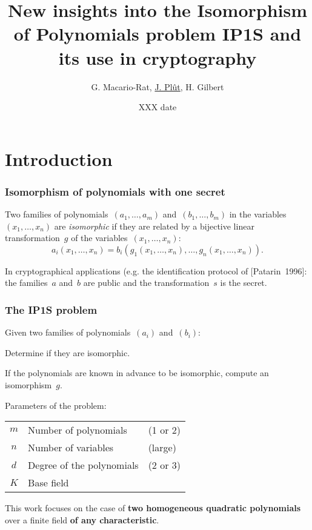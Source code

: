 \documentclass{beamer}%
\def\strong#1{{\bf\color{rouge}#1}}
\begin{document}
\title[New insights into IP1S]%
  {New insights into the Isomorphism of Polynomials problem IP1S and
  its use in cryptography}
\author{G. Macario-Rat, \underline{J. Plût}, H. Gilbert}
\date{XXX date}
%

\begin{frame}
\titlepage
\end{frame}%
\section{Introduction}
\begin{frame}\frametitle{Isomorphism of polynomials with one secret} %

\begin{definition}
Two families of polynomials~$(a_1, …, a_m)$ and~$(b_1, …, b_m)$ in the
variables~$(x_1, …, x_n)$ are \emph{isomorphic} if they are related by a
bijective linear transformation~$g$ of the variables~$(x_1, …, x_n)$:
\[ a_i (x_1, …, x_n) = b_i (g_1 (x_1, …, x_n), …, g_n (x_1, …, x_n)). \]
\end{definition}

In cryptographical applications (e.g. the identification protocol of
[Patarin~1996]: the families~$a$ and~$b$ are public and the
transformation~$s$ is the secret.
\end{frame}%
\begin{frame}\frametitle{The IP1S problem}%

\begin{df}
Given two families of polynomials~$(a_i)$ and~$(b_i)$:
\begin{description}[labelwidth=1ex,align=parleft]
\item[Decisional IP1S] Determine if they are isomorphic.
\item[\textbf{Computational IP1S}] If the polynomials are known in
advance to be isomorphic, compute an isomorphism~$g$.
\end{description}
\end{df}

Parameters of the problem:

\medbreak\hfil\begin{tabular}{cll}\toprule \color{rouge}$m$ & Number of
polynomials & (1 or 2)\\ \color{rouge}$n$ & Number of variables &
(large)\\ \color{rouge}$d$ & Degree of the polynomials & (2 or 3)\\
\color{rouge}$K$ & Base field\\\bottomrule
\end{tabular}
\medbreak

This work focuses on the case of \strong{two homogeneous quadratic
polynomials} over a finite field \strong{of any characteristic}.
\end{frame}%
\end{document}
